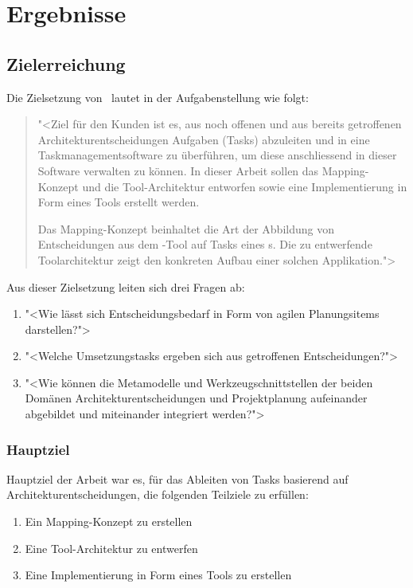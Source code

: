 \chapter{Ergebnisse}
	
	\section{Zielerreichung}
		Die Zielsetzung von \eeppi\ lautet in der Aufgabenstellung wie folgt:
		\begin{quote}
			"<Ziel für den Kunden ist es, aus noch offenen und aus bereits getroffenen Architekturentscheidungen  Aufgaben (Tasks) abzuleiten und in eine Taskmanagementsoftware zu überführen, um diese anschliessend in dieser Software verwalten zu können. In dieser Arbeit sollen das Mapping-Konzept und die Tool-Architektur entworfen sowie eine Implementierung in Form eines Tools erstellt werden.
			
			Das Mapping-Konzept beinhaltet die Art der Abbildung von Entscheidungen aus dem \cdar-Tool auf Tasks eines \ppt s. Die zu entwerfende Toolarchitektur zeigt den konkreten Aufbau einer solchen Applikation.">
		\end{quote}
		
	Aus dieser Zielsetzung leiten sich drei Fragen ab:
	\begin{enumerate}
		\item{"<Wie lässt sich Entscheidungsbedarf in Form von agilen Planungsitems darstellen?">}
		\item{"<Welche Umsetzungstasks ergeben sich aus getroffenen Entscheidungen?">}
		\item{"<Wie können die Metamodelle und Werkzeugschnittstellen der beiden Domänen Architekturentscheidungen und Projektplanung aufeinander abgebildet und miteinander integriert werden?">}
	\end{enumerate}
	
	\subsection{Hauptziel}
		Hauptziel der Arbeit war es, für das Ableiten von Tasks basierend auf Architekturentscheidungen, die folgenden Teilziele zu erfüllen:
		\begin{enumerate}
			\item{Ein Mapping-Konzept zu erstellen}
			\item{Eine Tool-Architektur zu entwerfen}
			\item{Eine Implementierung in Form eines Tools zu erstellen}
		\end{enumerate}
		
